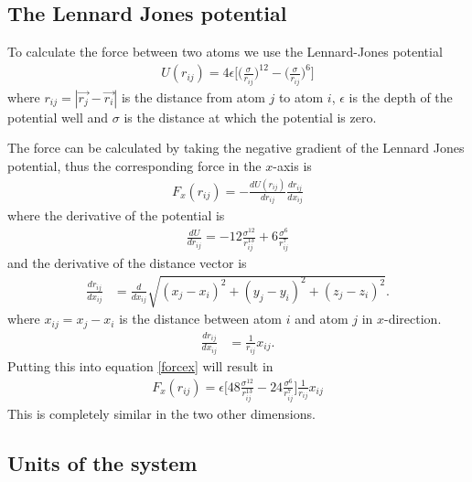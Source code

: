 \documentclass{article}
\begin{document}
\subsection{The Lennard Jones potential}

To calculate the force between two atoms we use the Lennard-Jones potential
\begin{align}
	U(r_{ij})=4\epsilon\Big[\Big(\frac{\sigma}{r_{ij}}\Big)^{12}-\Big(\frac{\sigma}{r_{ij}}\Big)^{6}\Big]
\end{align}
where $r_{ij}=|\vec{r_j}-\vec{r_i}|$ is the distance from atom $j$ to atom $i$, $\epsilon$ is the depth of the potential well and $\sigma$ is the distance at which the potential is zero.

The force can be calculated by taking the negative gradient of the Lennard Jones potential, thus the corresponding force in the $x$-axis is
\begin{align}
	F_x(r_{ij}) = - \frac{dU(r_{ij})}{dr_{ij}}\frac{dr_{ij}}{dx_{ij}}
	\label{forcex}
\end{align}
where the derivative of the potential is
\begin{align}
	\frac{dU}{dr_{ij}}=-12\frac{\sigma^12}{r_{ij}^{13}} + 6 \frac{\sigma^6}{r_{ij}^7}
\end{align}
and the derivative of the distance vector is
\begin{align}
	\frac{dr_{ij}}{dx_{ij}}&=\frac{d}{dx_{ij}}\sqrt{(x_j-x_i)^2+(y_j-y_i)^2+(z_j-z_i)^2}.
\end{align}
where $x_{ij}=x_j-x_i$ is the distance between atom $i$ and atom $j$ in $x$-direction.
\begin{align}
	\frac{dr_{ij}}{dx_{ij}}&=\frac{1}{r_{ij}}x_{ij}.
\end{align}
Putting this into equation \ref{forcex} will result in
\begin{align}
	F_x(r_{ij})= \epsilon \Big[48\frac{\sigma^{12}}{r_{ij}^{13}} - 24 \frac{\sigma^6}{r_{ij}^7}\Big]\frac{1}{r_{ij}}x_{ij}
\end{align}
This is completely similar in the two other dimensions.

\subsection{Units of the system}
\end{document}
